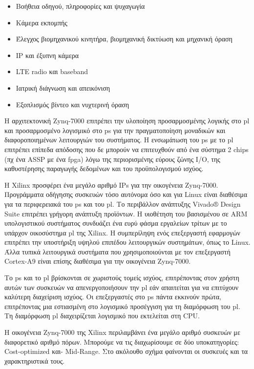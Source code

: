 \begin{itemize}
	\item Βοήθεια οδηγού, πληροφορίες και ψυχαγωγία
	\item Κάμερα εκπομπής
	\item Έλεγχος βιομηχανικού κινητήρα, βιομηχανική δικτύωση και μηχανική όραση
	\item IP και έξυπνη κάμερα
	\item LTE radio και baseband
	\item Ιατρική διάγνωση και απεικόνιση
	\item Εξοπλισμός βίντεο και νυχτερινή όραση \\
\end{itemize}

Η αρχιτεκτονική Zynq-7000 επιτρέπει την υλοποίηση προσαρμοσμένης λογικής στο \gls{pl} και προσαρμοσμένο λογισμικό στο \gls{ps} για την πραγματοποίηση μοναδικών και διαφοροποιημένων λειτουργιών του συστήματος. Η ενσωμάτωση του \gls{ps} με το \gls{pl} επιτρέπει επίπεδα απόδοσης που δε μπορούν να επιτευχθούν από ένα σύστημα 2 chips (πχ ένα ASSP με ένα \gls{fpga}) λόγω της περιορισμένης εύρους ζώνης I/O, της καθυστέρησης παραγωγής δεδομένων και του προϋπολογισμού ισχύος.

Η Xilinx προσφέρει ένα μεγάλο αριθμό IPs για την οικογένεια Zynq-7000. Προγράμματα οδήγησης συσκευών τόσο αυτόνομα όσο και για Linux είναι διαθέσιμα για τα περιφερειακά του \gls{ps} και του \gls{pl}. Το περιβάλλον ανάπτυξης Vivado® Design Suite επιτρέπει γρήγορη ανάπτυξη προϊόντων. Η υιοθέτηση του βασισμένου σε ARM υπολογιστικού συστήματος συνδυάζει ένα ευρύ φάσμα εργαλείων τρίτων με το υπάρχον οικοσύστημα \gls{pl} της Xilinx. Η συμπερίληψη ενός επεξεργαστή εφαρμογών επιτρέπει την υποστήριξη υψηλού επιπέδου λειτουργικών συστημάτων, όπως το Linux. Άλλα τυπικά λειτουργικά συστήματα που χρησιμοποιούνται με τον επεξεργαστή Cortex-A9 είναι επίσης διαθέσιμα για την οικογένεια Zynq-7000.

Το \gls{ps} και το \gls{pl} βρίσκονται σε χωριστούς τομείς ισχύος, επιτρέποντας στον χρήστη αυτών των συσκευών να απενεργοποιήσουν την \gls{pl} εάν απαιτείται για να επιτύχουν καλύτερη διαχείριση ισχύος. Οι επεξεργαστές στο \gls{ps} πάντα εκκινούν πρώτα, επιτρέποντας μια εστιασμένη στο λογισμικό προσέγγιση για τη διαμόρφωση του \gls{pl}. Τη διαμόρφωση \gls{pl} διαχειρίζεται λογισμικό που εκτελείται στη CPU.

Η οικογένεια Zynq-7000 της Xilinx περιλαμβάνει ένα μεγάλο αριθμό συσκευών με διαφορετικό αριθμό πόρων. Μπορούμε να τις διαχωρίσουμε σε δύο υποκατηγορίες: Cost-optimized και- Mid-Range. Στο ακόλουθο σχήμα φαίνονται οι συσκευές και τα χαρακτηριστικά τους. \cite{Crockett:2014:ZBE:2685817}


